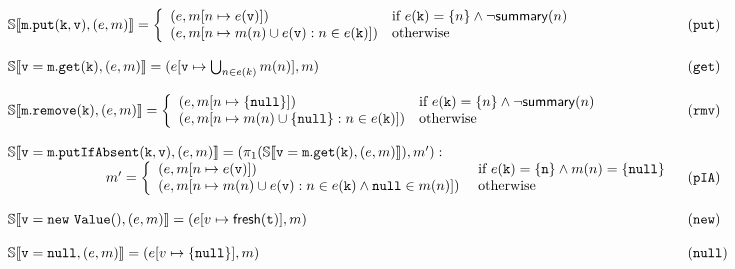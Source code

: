 \begin{figure*}
\[
\begin{array}{ll}
\mathbb{S}\llbracket \mathtt{m.put(k, v)}, (e, m) \rrbracket = \left\{
\begin{array}{ll}
(e, m[n \mapsto e(\mathtt{v})]) & \textrm{if } e(\mathtt{k})=\{n\} \land \neg \mathsf{summary}(n)\\
(e, m[n \mapsto m(n) \cup e(\mathtt{v}) : n \in e(\mathtt{k})]) & \textrm{otherwise}\\
\end{array}
\right. & (\mathtt{put})\\
\\
\mathbb{S}\llbracket \mathtt{v=m.get(k)}, (e, m) \rrbracket = (e[\mathtt{v} \mapsto \bigcup_{n \in e(k)} m(n)], m) & (\mathtt{get})\\
\\
\mathbb{S}\llbracket \mathtt{m.remove(k)}, (e, m) \rrbracket =  \left\{
\begin{array}{ll}
(e, m[n \mapsto \{\mathtt{null}\}]) & \textrm{if } e(\mathtt{k})=\{n\} \land \neg \mathsf{summary}(n)\\
(e, m[n \mapsto m(n) \cup \{\mathtt{null}\} : n \in e(\mathtt{k})]) & \textrm{otherwise}\\
\end{array}
\right. & (\mathtt{rmv})\\ 
\\
\mathbb{S}\llbracket \mathtt{v = m.putIfAbsent(k, v)}, (e, m) \rrbracket =  (\pi_1(\mathbb{S}\llbracket \mathtt{v = m.get(k)}, (e, m) \rrbracket), m') : & \\
\hspace{70pt} 
m'=
\left\{
\begin{array}{ll}
(e, m[n \mapsto e(\mathtt{v})]) & \textrm{ if } e(\mathtt{k})=\{\mathtt{n}\} \land m(n) = \{\mathtt{null}\}\\
(e, m[n \mapsto m(n) \cup e(\mathtt{v}) : n \in e(\mathtt{k}) \land \mathtt{null} \in m(n)]) & \textrm{ otherwise}\\
\end{array}
\right. & (\mathtt{pIA})\\
\\
\mathbb{S}\llbracket \mathtt{v = new\ Value()}, (e, m) \rrbracket =  (e[v \mapsto \mathsf{fresh}(\mathtt{t})], m)& (\mathtt{new})\\
\\
\mathbb{S}\llbracket \mathtt{v = null}, (e, m) \rrbracket =  (e[v \mapsto \{\mathtt{null}\}], m)& (\mathtt{null})\\
\\

\end{array}\]
\end{figure*}
